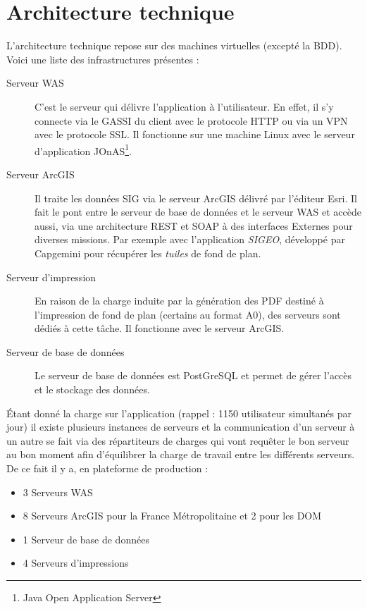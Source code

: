 \section{Architecture technique}
L'architecture technique repose sur des machines virtuelles (excepté la BDD).
Voici une liste des infrastructures présentes :
\begin{description}
	\item[Serveur WAS] C'est le serveur qui délivre l'application à l'utilisateur. En effet, il s'y connecte via le GASSI du client avec le protocole HTTP ou via un VPN avec le protocole SSL. Il fonctionne sur une machine Linux avec le serveur d'application JOnAS\footnote{Java Open Application Server}.
\item[Serveur ArcGIS] Il traite les données SIG via le serveur ArcGIS délivré par l'éditeur Esri. Il fait le pont entre le serveur de base de données et le serveur WAS et accède aussi, via une architecture REST et SOAP à des interfaces Externes pour diverses missions. Par exemple avec l'application \textit{SIGEO}, développé par Capgemini pour récupérer les \textit{tuiles} de fond de plan.
\item[Serveur d'impression] En raison de la charge induite par la génération des PDF destiné à l'impression de fond de plan (certains au format A0), des serveurs sont dédiés à cette tâche. Il fonctionne avec le serveur ArcGIS.
\item[Serveur de base de données] Le serveur de base de données est PostGreSQL et permet de gérer l'accès et le stockage des données.\\
\end{description}

\'Etant donné la charge sur l'application (rappel : 1150 utilisateur simultanés par jour) il existe plusieurs instances de serveurs et la communication d'un serveur à un autre se fait via des répartiteurs de charges qui vont requêter le bon serveur au bon moment afin d'équilibrer la charge de travail entre les différents serveurs. De ce fait il y a, en plateforme de production :

\begin{itemize}
	\item 3 Serveurs WAS
	\item 8 Serveurs ArcGIS pour la France Métropolitaine et 2 pour les DOM
	\item 1 Serveur de base de données
	\item 4 Serveurs d'impressions\\
\end{itemize}
